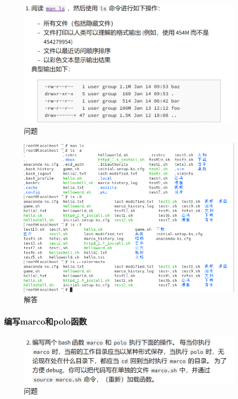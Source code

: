 \documentclass{ctexart}
\begin{document}
	\begin{figure}[H]
		\centering
		\includegraphics{2.29}
		\caption{问题}
	\end{figure}
	
	\begin{figure}[H]
		\centering
		\includegraphics{2.30}
		\caption{解答}
	\end{figure}
	
	\subsubsection{编写marco和polo函数}
	
	\begin{figure}[H]
		\centering
		\includegraphics{2.31}
		\caption{问题}
	\end{figure}
	
\end{document}
